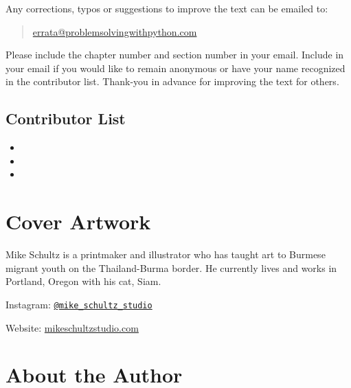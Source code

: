 \documentclass{book}
\begin{document}
    
        Any corrections, typos or suggestions to improve the text can be emailed
to:

\begin{quote}
\url{errata@problemsolvingwithpython.com}
\end{quote}

Please include the chapter number and section number in your email.
Include in your email if you would like to remain anonymous or have your
name recognized in the contributor list. Thank-you in advance for
improving the text for others.
    




    
        \subsection{Contributor List}\label{contributor-list}

\begin{itemize}
\item
\item
\item
\end{itemize}
    




    
        \section{Cover Artwork}\label{cover-artwork}
    




    
        Mike Schultz is a printmaker and illustrator who has taught art to
Burmese migrant youth on the Thailand-Burma border. He currently lives
and works in Portland, Oregon with his cat, Siam.

Instagram:
\href{https://www.instagram.com/mike_schultz_studio/}{\lstinline!@mike_schultz_studio!}

Website:
\href{http://mikeschultzstudio.squarespace.com/}{mikeschultzstudio.com}
    




    
        \section{About the Author}\label{about-the-author}
    
\end{document}

